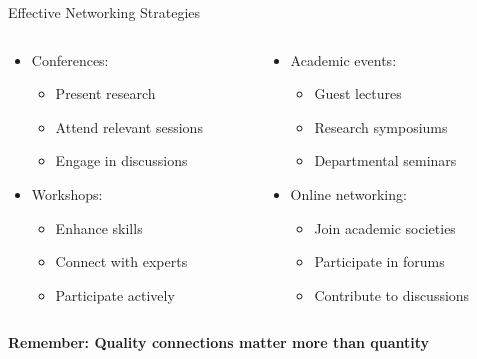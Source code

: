 \documentclass[10pt]{beamer}
\begin{document}
\begin{frame}[fragile]{Effective Networking Strategies}
    \begin{columns}[T]
        \begin{column}{0.5\textwidth}
            \begin{itemize}
                \item Conferences:
                    \begin{itemize}
                        \item Present research
                        \item Attend relevant sessions
                        \item Engage in discussions
                    \end{itemize}
                \item Workshops:
                    \begin{itemize}
                        \item Enhance skills
                        \item Connect with experts
                        \item Participate actively
                    \end{itemize}
            \end{itemize}
        \end{column}
        \begin{column}{0.5\textwidth}
            \begin{itemize}
                \item Academic events:
                    \begin{itemize}
                        \item Guest lectures
                        \item Research symposiums
                        \item Departmental seminars
                    \end{itemize}
                \item Online networking:
                    \begin{itemize}
                        \item Join academic societies
                        \item Participate in forums
                        \item Contribute to discussions
                    \end{itemize}
            \end{itemize}
        \end{column}
    \end{columns}
    \vspace{0.5cm}
    \centering\textbf{Remember: Quality connections matter more than quantity}
\end{frame}
\end{document}
